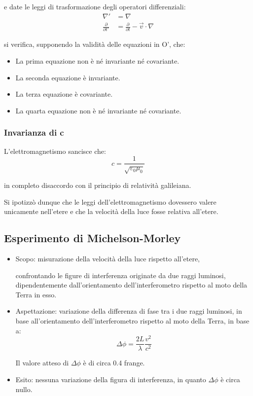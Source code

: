 \documentclass{article}
\begin{document}
e date le leggi di trasformazione degli operatori differenziali:
\begin{equation}
\begin{aligned}
    \nabla' &= \nabla \\
    \frac{\partial}{\partial t'} &= \frac{\partial}{\partial t} - \vec{v} \cdot \nabla
\end{aligned}
\end{equation}

si verifica, supponendo la validità delle equazioni in O', che:
\begin{itemize}
    \item La prima equazione non è né invariante né covariante.
    \item La seconda equazione è invariante.
    \item La terza equazione è covariante.
    \item La quarta equazione non è né invariante né covariante.
\end{itemize}

\subsubsection{Invarianza di c}
L'elettromagnetismo sancisce che:
\begin{equation}
    c = \frac{1}{\sqrt{\varepsilon_0 \mu_0}}
\end{equation}

in completo disaccordo con il principio di relatività galileiana.

Si ipotizzò dunque che le leggi dell'elettromagnetismo dovessero valere unicamente nell'etere e che la velocità della luce fosse relativa all'etere.

\subsection{Esperimento di Michelson-Morley}

\begin{itemize}
    \item Scopo: misurazione della velocità della luce rispetto all'etere, 
    
    confrontando le figure di interferenza originate da due raggi luminosi, dipendentemente dall'orientamento dell'interferometro rispetto al moto della Terra in esso.

    \item Aspettazione: variazione della differenza di fase tra i due raggi luminosi, in base all'orientamento dell'interferometro rispetto al moto della Terra, in base a:
    \begin{equation}
        \Delta \phi = \frac{2L}{\lambda} \frac{v^2}{c^2}
    \end{equation}

    Il valore atteso di $\Delta \phi$ è di circa 0.4 frange.

    \item Esito: nessuna variazione della figura di interferenza, in quanto $\Delta \phi$ è circa nullo.
\end{itemize}
\end{document}
